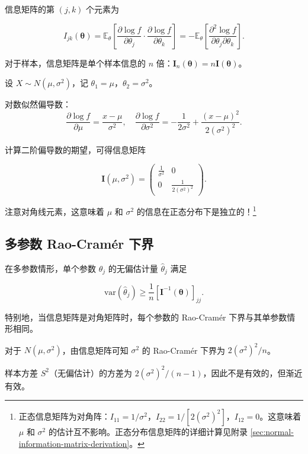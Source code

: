 信息矩阵的第 $(j,k)$ 个元素为

\[
I_{jk}(\boldsymbol{\theta}) = \mathbb{E}_\theta\left[ \frac{\partial \log f}{\partial \theta_j} \cdot \frac{\partial \log f}{\partial \theta_k} \right] = -\mathbb{E}_\theta\left[ \frac{\partial^2 \log f}{\partial \theta_j \partial \theta_k} \right].
\label{eq:information-matrix-elements}
\]

对于样本，信息矩阵是单个样本信息的 $n$ 倍：$\mathbf{I}_n(\boldsymbol{\theta}) = n\mathbf{I}(\boldsymbol{\theta})$。

\begin{example}[正态分布的信息矩阵]\label{ex:normal-information-matrix}
设 $X \sim N(\mu, \sigma^2)$，记 $\theta_1 = \mu$，$\theta_2 = \sigma^2$。

对数似然偏导数：
\[
\frac{\partial \log f}{\partial \mu} = \frac{x-\mu}{\sigma^2}, \quad
\frac{\partial \log f}{\partial \sigma^2} = -\frac{1}{2\sigma^2} + \frac{(x-\mu)^2}{2(\sigma^2)^2}.
\]

计算二阶偏导数的期望，可得信息矩阵

\[
\mathbf{I}(\mu, \sigma^2) = \begin{pmatrix} \frac{1}{\sigma^2} & 0 \\ 0 & \frac{1}{2(\sigma^2)^2} \end{pmatrix}.
\label{eq:normal-information-matrix}
\]

注意对角线元素，这意味着 $\mu$ 和 $\sigma^2$ 的信息在正态分布下是独立的！\footnote{正态信息矩阵为对角阵：$I_{11} = 1/\sigma^2$，$I_{22} = 1/[2(\sigma^2)^2]$，$I_{12} = 0$。这意味着 $\mu$ 和 $\sigma^2$ 的估计互不影响。正态分布信息矩阵的详细计算见附录 \cref{sec:normal-information-matrix-derivation}。}
\end{example}

\subsection{多参数 Rao-Cramér 下界}

在多参数情形，单个参数 $\theta_j$ 的无偏估计量 $\widehat{\theta}_j$ 满足

\[
\text{var}(\widehat{\theta}_j) \geq \frac{1}{n} [\mathbf{I}^{-1}(\boldsymbol{\theta})]_{jj}.
\label{eq:multiparameter-rao-cramer}
\]

特别地，当信息矩阵是对角矩阵时，每个参数的 Rao-Cramér 下界与其单参数情形相同。

\begin{example}[正态方差估计的效率]\label{ex:normal-variance-efficiency}
对于 $N(\mu, \sigma^2)$，由信息矩阵可知 $\sigma^2$ 的 Rao-Cramér 下界为 $2(\sigma^2)^2/n$。

样本方差 $S^2$（无偏估计）的方差为 $2(\sigma^2)^2/(n-1)$，因此不是有效的，但渐近有效。
\end{example}

